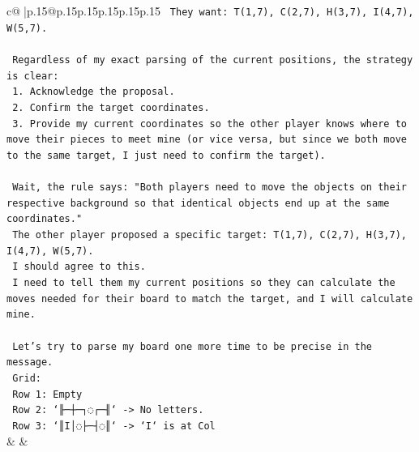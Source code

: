 \documentclass{article}
\begin{document}
{\begin{supertabular}{c@{$\;$}|p{.15\linewidth}@{}p{.15\linewidth}p{.15\linewidth}p{.15\linewidth}p{.15\linewidth}p{.15\linewidth}}
{{{\texttt{   They want: T(1,7), C(2,7), H(3,7), I(4,7), W(5,7).} \\
\\ 
\texttt{   Regardless of my exact parsing of the current positions, the strategy is clear:} \\
\texttt{   1. Acknowledge the proposal.} \\
\texttt{   2. Confirm the target coordinates.} \\
\texttt{   3. Provide my current coordinates so the other player knows where to move their pieces to meet mine (or vice versa, but since we both move to the same target, I just need to confirm the target).} \\
\\ 
\texttt{   Wait, the rule says: "Both players need to move the objects on their respective background so that identical objects end up at the same coordinates."} \\
\texttt{   The other player proposed a specific target: T(1,7), C(2,7), H(3,7), I(4,7), W(5,7).} \\
\texttt{   I should agree to this.} \\
\texttt{   I need to tell them my current positions so they can calculate the moves needed for their board to match the target, and I will calculate mine.} \\
\\ 
\texttt{   Let's try to parse my board one more time to be precise in the message.} \\
\texttt{   Grid:} \\
\texttt{   Row 1: Empty} \\
\texttt{   Row 2: `╟─┼─┐◌┌─╢` {-}> No letters.} \\
\texttt{   Row 3: `║I│◌├─┤◌║` {-}> `I` is at Col} \\
            }
        }
    }
    & & \\ \\


\end{supertabular}}
\end{document}
